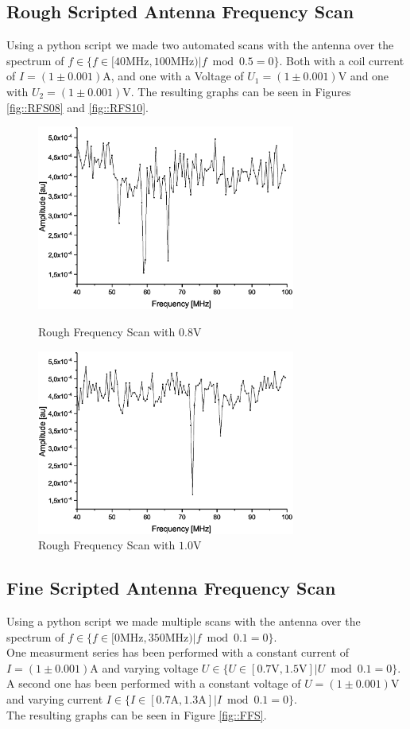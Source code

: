 \documentclass[12pt]{article}
\begin{document}
\subsection{Rough Scripted Antenna Frequency Scan}
Using a python script we made two automated scans with the antenna over the spectrum of 
$ f \in \{ f \in [40\text{MHz},100\text{MHz}) | f \bmod 0.5 = 0\} $.
Both with a coil current of $ I=(1 \pm 0.001)\text{A} $, and one with a Voltage of $ U_1=(1 \pm 0.001) \text{V} $ and one with $ U_2=(1 \pm 0.001) \text{V} $.
The resulting graphs can be seen in Figures \eqref{fig::RFS08} and \eqref{fig::RFS10}.

\begin{figure}[h]
  \centering
  \parbox{70mm}{
    \centering
    \includegraphics[width=85mm]{08V.eps}
    \caption{Rough Frequency Scan with $0.8$V}
    \label{fig::RFS08}
  }
  \hfill
  \parbox{70mm}{
    \centering
    \includegraphics[width=85mm]{10V.eps}
    \caption{Rough Frequency Scan with $1.0$V}
    \label{fig::RFS10}
  }
\end{figure}

\subsection{Fine Scripted Antenna Frequency Scan}
Using a python script we made multiple scans with the antenna over the spectrum of 
$ f \in \{ f \in [0\text{MHz},350\text{MHz}) | f \bmod 0.1 = 0\} $. \\
One measurment series has been performed with a constant current of $ I=(1 \pm 0.001)\text{A} $ and varying voltage 
$ U \in \{ U \in [0.7\text{V},1.5\text{V}] | U \bmod 0.1 = 0\} $. \\
A second one has been performed with a constant voltage of $ U=(1 \pm 0.001)\text{V} $ and varying current
$ I \in \{ I \in [0.7\text{A},1.3\text{A}] | I \bmod 0.1 = 0\} $.\\
The resulting graphs can be seen in Figure \eqref{fig::FFS}.
\end{document}
